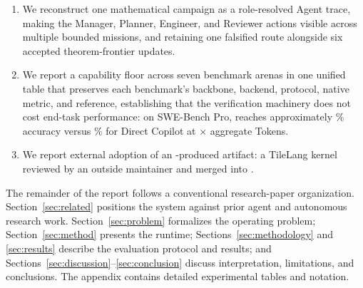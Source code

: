 \begin{enumerate}[label=\textbf{C\arabic*.}]
  \item We reconstruct one mathematical campaign as a role-resolved Agent trace,
    making the Manager, Planner, Engineer, and Reviewer actions visible across
    multiple bounded missions, and retaining one falsified route alongside six
    accepted theorem-frontier updates.
  \item We report a capability floor across seven benchmark arenas in one unified
    table that preserves each benchmark's backbone, backend, protocol, native metric,
    and reference, establishing that the verification machinery does not cost
    end-task performance: on SWE-Bench Pro, \systemname reaches approximately
    \SWEProArgusAccuracy\% accuracy versus \SWEProDirectAccuracy\% for Direct Copilot
    at \SWEProTokenRatio$\times$ aggregate Tokens.
  \item We report external adoption of an \systemname-produced artifact: a TileLang
     kernel reviewed by an outside maintainer and merged into
    .
\end{enumerate}

The remainder of the report follows a conventional research-paper organization.
Section~\ref{sec:related} positions the system against prior agent and autonomous
research work. Section~\ref{sec:problem} formalizes the operating problem;
Section~\ref{sec:method} presents the runtime; Sections~\ref{sec:methodology} and
\ref{sec:results} describe the evaluation protocol and results; and
Sections~\ref{sec:discussion}--\ref{sec:conclusion} discuss interpretation,
limitations, and conclusions. The appendix contains detailed experimental tables
and notation.
